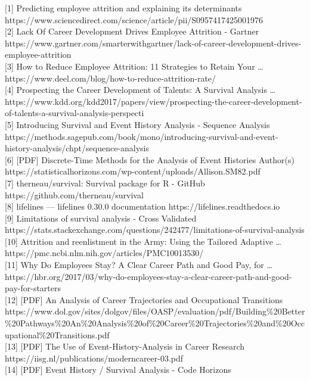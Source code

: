 \documentclass[
  letterpaper,
  DIV=11,
  numbers=noendperiod]{scrartcl}
\begin{document}
{[}1{]} Predicting employee attrition and explaining its determinants
https://www.sciencedirect.com/science/article/pii/S0957417425001976\\
{[}2{]} Lack Of Career Development Drives Employee Attrition - Gartner
https://www.gartner.com/smarterwithgartner/lack-of-career-development-drives-employee-attrition\\
{[}3{]} How to Reduce Employee Attrition: 11 Strategies to Retain Your
\ldots{} https://www.deel.com/blog/how-to-reduce-attrition-rate/\\
{[}4{]} Prospecting the Career Development of Talents: A Survival
Analysis \ldots{}
https://www.kdd.org/kdd2017/papers/view/prospecting-the-career-development-of-talents-a-survival-analysis-perspecti\\
{[}5{]} Introducing Survival and Event History Analysis - Sequence
Analysis
https://methods.sagepub.com/book/mono/introducing-survival-and-event-history-analysis/chpt/sequence-analysis\\
{[}6{]} {[}PDF{]} Discrete-Time Methods for the Analysis of Event
Histories Author(s)
https://statisticalhorizons.com/wp-content/uploads/Allison.SM82.pdf\\
{[}7{]} therneau/survival: Survival package for R - GitHub
https://github.com/therneau/survival\\
{[}8{]} lifelines --- lifelines 0.30.0 documentation
https://lifelines.readthedocs.io\\
{[}9{]} Limitations of survival analysis - Cross Validated
https://stats.stackexchange.com/questions/242477/limitations-of-survival-analysis\\
{[}10{]} Attrition and reenlistment in the Army: Using the Tailored
Adaptive \ldots{} https://pmc.ncbi.nlm.nih.gov/articles/PMC10013530/\\
{[}11{]} Why Do Employees Stay? A Clear Career Path and Good Pay, for
\ldots{}
https://hbr.org/2017/03/why-do-employees-stay-a-clear-career-path-and-good-pay-for-starters\\
{[}12{]} {[}PDF{]} An Analysis of Career Trajectories and Occupational
Transitions
https://www.dol.gov/sites/dolgov/files/OASP/evaluation/pdf/Building\%20Better\%20Pathways\%20An\%20Analysis\%20of\%20Career\%20Trajectories\%20and\%20Occupational\%20Transitions.pdf\\
{[}13{]} {[}PDF{]} The Use of Event-History-Analysis in Career Research
https://iisg.nl/publications/moderncareer-03.pdf\\
{[}14{]} {[}PDF{]} Event History / Survival Analysis - Code Horizons
\end{document}

